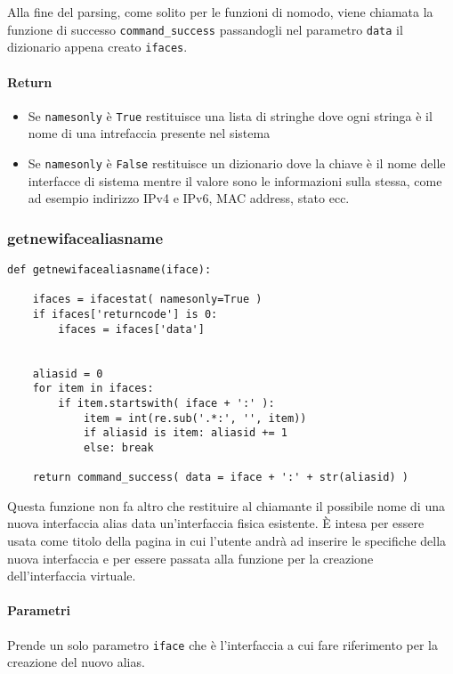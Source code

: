 \documentclass[11pt]{article}
\begin{document}
Alla fine del parsing, come solito per le funzioni di nomodo, viene chiamata la funzione di successo \texttt{command\_success}
passandogli nel parametro \texttt{data} il dizionario appena creato \texttt{ifaces}.
\paragraph{Return}
\begin{itemize}
	\item{Se \texttt{namesonly} è \texttt{True} restituisce una lista di stringhe dove ogni stringa è il nome di una intrefaccia
		presente nel sistema}
	\item{Se \texttt{namesonly} è \texttt{False} restituisce un dizionario dove la chiave è il nome delle interfacce di sistema
		mentre il valore sono le informazioni sulla stessa, come ad esempio indirizzo IPv4 e IPv6, MAC address, stato ecc.}
\end{itemize}

\subsubsection{getnewifacealiasname}\label{getnewifacealiasname}
\begin{lstlisting}
def getnewifacealiasname(iface):
    
    ifaces = ifacestat( namesonly=True )
    if ifaces['returncode'] is 0:
        ifaces = ifaces['data']

    
    aliasid = 0
    for item in ifaces:
        if item.startswith( iface + ':' ):
            item = int(re.sub('.*:', '', item))
            if aliasid is item: aliasid += 1
            else: break

    return command_success( data = iface + ':' + str(aliasid) )
\end{lstlisting}
Questa funzione non fa altro che restituire al chiamante il possibile nome di una nuova interfaccia alias
data un'interfaccia fisica esistente. È intesa per essere usata come titolo della pagina in cui l'utente
andrà ad inserire le specifiche della nuova interfaccia e per essere passata alla funzione 
per la creazione dell'interfaccia virtuale.
\paragraph{Parametri}
Prende un solo parametro \texttt{iface} che è l'interfaccia a cui fare riferimento per la creazione del nuovo alias.
\end{document}
